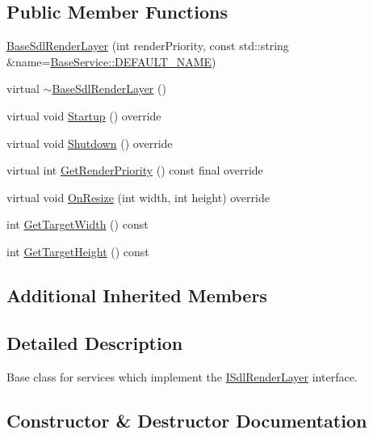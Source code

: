 \subsection*{Public Member Functions}
\begin{DoxyCompactItemize}
\item 
\hyperlink{classastu_1_1BaseSdlRenderLayer_a9fc94044d6b75261798b1a1ead9e561d}{Base\+Sdl\+Render\+Layer} (int render\+Priority, const std\+::string \&name=\hyperlink{classastu_1_1BaseService_a9483b26ad631bd14646ef2d2170cd828}{Base\+Service\+::\+D\+E\+F\+A\+U\+L\+T\+\_\+\+N\+A\+ME})
\item 
virtual \hyperlink{classastu_1_1BaseSdlRenderLayer_a062e0d1188290dea9e8329265c114764}{$\sim$\+Base\+Sdl\+Render\+Layer} ()
\item 
virtual void \hyperlink{classastu_1_1BaseSdlRenderLayer_a0f4fbd9bbd5613589a8f1ce39d8b6340}{Startup} () override
\item 
virtual void \hyperlink{classastu_1_1BaseSdlRenderLayer_a786ae49f41873d498ae0d22a0f3a5349}{Shutdown} () override
\item 
virtual int \hyperlink{classastu_1_1BaseSdlRenderLayer_a612a7ecc518ea150bbed605a6aa19602}{Get\+Render\+Priority} () const final override
\item 
virtual void \hyperlink{classastu_1_1BaseSdlRenderLayer_a5b9f77db50819d6b29e0e8361d7fd91e}{On\+Resize} (int width, int height) override
\item 
int \hyperlink{classastu_1_1BaseSdlRenderLayer_a535b982190208e361f6b2c3cd717cb97}{Get\+Target\+Width} () const
\item 
int \hyperlink{classastu_1_1BaseSdlRenderLayer_a6e897555380c2ba39af2d6a10c79283f}{Get\+Target\+Height} () const
\end{DoxyCompactItemize}
\subsection*{Additional Inherited Members}


\subsection{Detailed Description}
Base class for services which implement the \hyperlink{classastu_1_1ISdlRenderLayer}{I\+Sdl\+Render\+Layer} interface. 

\subsection{Constructor \& Destructor Documentation}
\mbox{\label{classastu_1_1BaseSdlRenderLayer_a9fc94044d6b75261798b1a1ead9e561d}} 
